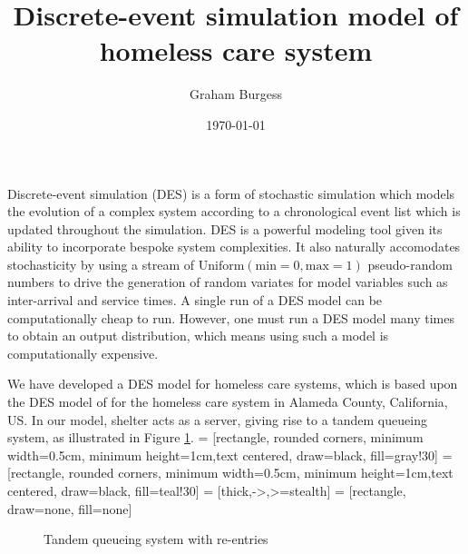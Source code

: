 \documentclass[12pt,a4paper]{article}
\title{Discrete-event simulation model of homeless care system}
\author{Graham Burgess}
\date{\today}
\begin{document}
%
\maketitle
%
Discrete-event simulation (DES) is a form of stochastic simulation which models the evolution of a complex system according to a chronological event list which is updated throughout the simulation. DES is a powerful modeling tool given its ability to incorporate bespoke system complexities. It also naturally accomodates stochasticity by using a stream of $\text{Uniform}(\text{min} = 0, \text{max} = 1)$ pseudo-random numbers to drive the generation of random variates for model variables such as inter-arrival and service times. A single run of a DES model can be computationally cheap to run. However, one must run a DES model many times to obtain an output distribution, which means using such a model is computationally expensive.

We have developed a DES model for homeless care systems, which is based upon the DES model of \cite{singham2023discrete} for the homeless care system in Alameda County, California, US. In our model, shelter acts as a server, giving rise to a tandem queueing system, as illustrated in Figure \ref{fig:des-q}.
%
 = [rectangle, rounded corners, minimum width=0.5cm, minimum height=1cm,text centered, draw=black, fill=gray!30]
 = [rectangle, rounded corners, minimum width=0.5cm, minimum height=1cm,text centered, draw=black, fill=teal!30]
 = [thick,->,>=stealth]
 = [rectangle, draw=none, fill=none]
%
\begin{figure}[h!]
  \begin{center}
    \caption{Tandem queueing system with re-entries} \label{fig:des-q}
  \end{center}
\end{figure}
%
\end{document}
